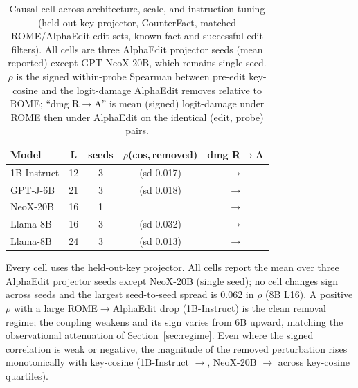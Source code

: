 \begin{table}[t]
\centering\small
\caption{Causal cell across architecture, scale, and instruction tuning
(held-out-key projector, CounterFact, matched ROME/AlphaEdit edit sets,
known-fact and successful-edit filters). All cells are three AlphaEdit
projector seeds (mean reported) except GPT-NeoX-20B, which remains
single-seed. $\rho$ is the signed within-probe Spearman between pre-edit
key-cosine and the logit-damage AlphaEdit removes relative to ROME;
``dmg R$\rightarrow$A'' is mean (signed) logit-damage under ROME then under
AlphaEdit on the identical (edit, probe) pairs.}
\label{tab:causal-scale}
\setlength{\tabcolsep}{3pt}
\begin{tabular}{@{}lcccc@{}}
\toprule
Model & L & seeds & $\rho$(cos,\,removed) & dmg R$\rightarrow$A \\
\midrule
1B-Instruct & 12 & 3 & \instructCausalRho{} {\scriptsize(sd 0.017)} & \instructDmgRome{}$\rightarrow$\instructDmgAlpha{} \\
GPT-J-6B    & 21 & 3 & \gptjCausalRho{} {\scriptsize(sd 0.018)}     & \gptjDmgRome{}$\rightarrow$\gptjDmgAlpha{} \\
NeoX-20B    & 16 & 1 & \neoxCausalRho{}                     & \neoxDmgRome{}$\rightarrow$\neoxDmgAlpha{} \\
Llama-8B    & 16 & 3 & \eightbCausalRhoLsixteen{} {\scriptsize(sd 0.032)}    & \eightbDmgRomeLsixteen{}$\rightarrow$\eightbDmgAlphaLsixteen{} \\
Llama-8B    & 24 & 3 & \eightbCausalRhoLtwentyfour{} {\scriptsize(sd 0.013)} & \eightbDmgRomeLtwentyfour{}$\rightarrow$\eightbDmgAlphaLtwentyfour{} \\
\bottomrule
\end{tabular}
\par\smallskip
{\footnotesize Every cell uses the held-out-key projector. All cells report the
mean over three AlphaEdit projector seeds except NeoX-20B (single seed); no
cell changes sign across seeds and the largest seed-to-seed spread is 0.062
in $\rho$ (8B L16).
A positive $\rho$ with a large ROME$\rightarrow$AlphaEdit drop (1B-Instruct)
is the clean removal regime; the coupling weakens and its sign varies from 6B
upward, matching the observational attenuation of Section~\ref{sec:regime}.
Even where the signed correlation is weak or negative, the magnitude of the
removed perturbation rises monotonically with key-cosine (1B-Instruct
\instructQuartLo{}$\rightarrow$\instructQuartHi{}, NeoX-20B
\neoxQuartLo{}$\rightarrow$\neoxQuartHi{} across key-cosine quartiles).\par}
\end{table}


